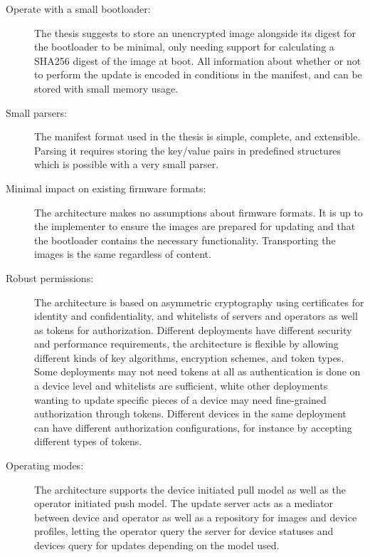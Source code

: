 \documentclass[0-thesis.tex]{subfiles}
\begin{document}
\begin{description}
    \item[Operate with a small bootloader:]
        The thesis suggests to store an unencrypted image alongside its digest for the
        bootloader to be minimal, only needing support for calculating a SHA256 digest of
        the image at boot. All information about whether or not to perform the update is
        encoded in conditions in the manifest, and can be stored with small memory usage.

    \item[Small parsers:]
        The manifest format used in the thesis is simple, complete, and extensible.
        Parsing it requires storing the key/value pairs in predefined structures which is
        possible with a very small parser.

    \item[Minimal impact on existing firmware formats:]
        The architecture makes no assumptions about firmware formats. It is up to the
        implementer to ensure the images are prepared for updating and that the bootloader
        contains the necessary functionality. Transporting the images is the same
        regardless of content.

    \item[Robust permissions:]
        The architecture is based on asymmetric cryptography using certificates for
        identity and confidentiality, and whitelists of servers and operators as well as
        tokens for authorization. Different deployments have different security and
        performance requirements, the architecture is flexible by allowing different kinds
        of key algorithms, encryption schemes, and token types. Some deployments may not
        need tokens at all as authentication is done on a device level and whitelists are
        sufficient, white other deployments wanting to update specific pieces of a device
        may need fine-grained authorization through tokens. Different devices in the same
        deployment can have different authorization configurations, for instance by
        accepting different types of tokens.

    \item[Operating modes:]
        The architecture supports the device initiated pull model as well as the operator
        initiated push model. The update server acts as a mediator between device and
        operator as well as a repository for images and device profiles, letting the
        operator query the server for device statuses and devices query for updates
        depending on the model used.
\end{description}
\end{document}
